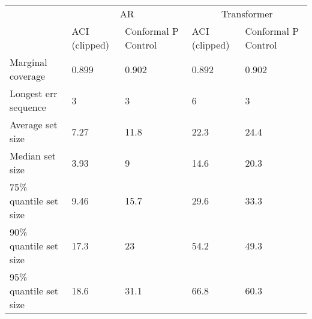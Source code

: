 \begin{tabular}{lllll}
\toprule
& \multicolumn{2}{c}{AR}& \multicolumn{2}{c}{Transformer} \\
& ACI (clipped) & Conformal P Control & ACI (clipped) & Conformal P Control \\
\midrule
Marginal coverage & 0.899 & 0.902 & 0.892 & 0.902 \\
Longest err sequence & 3 & 3 & 6 & 3 \\
Average set size & 7.27 & 11.8 & 22.3 & 24.4 \\
Median set size & 3.93 & 9 & 14.6 & 20.3 \\
75\% quantile set size & 9.46 & 15.7 & 29.6 & 33.3 \\
90\% quantile set size & 17.3 & 23 & 54.2 & 49.3 \\
95\% quantile set size & 18.6 & 31.1 & 66.8 & 60.3 \\
\bottomrule
\end{tabular}
